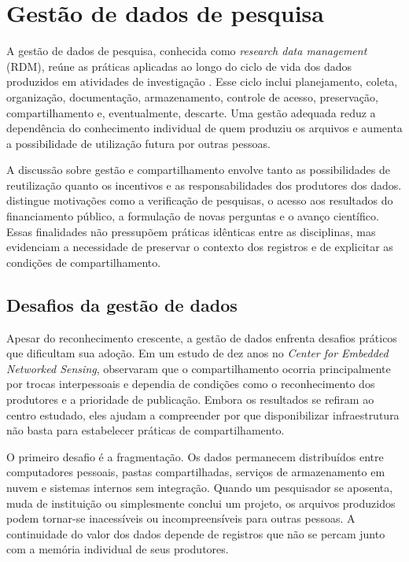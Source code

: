\section{Gestão de dados de pesquisa}\label{sec:rdm}

A gestão de dados de pesquisa, conhecida como \textit{research data management} (RDM), reúne as práticas aplicadas ao longo do ciclo de vida dos dados produzidos em atividades de investigação \cite{higgins2008dcc}. Esse ciclo inclui planejamento, coleta, organização, documentação, armazenamento, controle de acesso, preservação, compartilhamento e, eventualmente, descarte. Uma gestão adequada reduz a dependência do conhecimento individual de quem produziu os arquivos e aumenta a possibilidade de utilização futura por outras pessoas.

A discussão sobre gestão e compartilhamento envolve tanto as possibilidades de reutilização quanto os incentivos e as responsabilidades dos produtores dos dados.  distingue motivações como a verificação de pesquisas, o acesso aos resultados do financiamento público, a formulação de novas perguntas e o avanço científico. Essas finalidades não pressupõem práticas idênticas entre as disciplinas, mas evidenciam a necessidade de preservar o contexto dos registros e de explicitar as condições de compartilhamento.

\subsection{Desafios da gestão de dados}

Apesar do reconhecimento crescente, a gestão de dados enfrenta desafios práticos que dificultam sua adoção. Em um estudo de dez anos no \textit{Center for Embedded Networked Sensing},  observaram que o compartilhamento ocorria principalmente por trocas interpessoais e dependia de condições como o reconhecimento dos produtores e a prioridade de publicação. Embora os resultados se refiram ao centro estudado, eles ajudam a compreender por que disponibilizar infraestrutura não basta para estabelecer práticas de compartilhamento.

O primeiro desafio é a fragmentação. Os dados permanecem distribuídos entre computadores pessoais, pastas compartilhadas, serviços de armazenamento em nuvem e sistemas internos sem integração. Quando um pesquisador se aposenta, muda de instituição ou simplesmente conclui um projeto, os arquivos produzidos podem tornar-se inacessíveis ou incompreensíveis para outras pessoas. A continuidade do valor dos dados depende de registros que não se percam junto com a memória individual de seus produtores.

